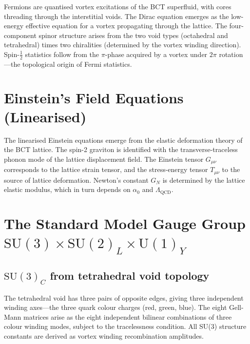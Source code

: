 \documentclass[review,number,sort&compress]{elsarticle}
\newcommand{\azero}{\alpha_0}
\newcommand{\LQCD}{\Lambda_{\mathrm{QCD}}}
\begin{document}
Fermions are quantised vortex excitations of the BCT superfluid, with
cores threading through the interstitial voids. The Dirac equation
emerges as the low-energy effective equation for a vortex propagating
through the lattice. The four-component spinor structure arises from the
two void types (octahedral and tetrahedral) times two chiralities
(determined by the vortex winding direction). Spin-$\frac{1}{2}$
statistics follow from the $\pi$-phase acquired by a vortex under
$2\pi$ rotation---the topological origin of Fermi statistics.

\section{Einstein's Field Equations (Linearised)}
\label{sec:einstein}

The linearised Einstein equations emerge from the elastic deformation
theory of the BCT lattice. The spin-2 graviton is identified with the
transverse-traceless phonon mode of the lattice displacement field.
The Einstein tensor $G_{\mu\nu}$ corresponds to the lattice strain
tensor, and the stress-energy tensor $T_{\mu\nu}$ to the source of
lattice deformation. Newton's constant $G_N$ is determined by the
lattice elastic modulus, which in turn depends on $\azero$ and $\LQCD$.

\section{The Standard Model Gauge Group
  $\mathrm{SU}(3) \times \mathrm{SU}(2)_L \times \mathrm{U}(1)_Y$}
\label{sec:gauge_group}

\subsection{$\mathrm{SU}(3)_C$ from tetrahedral void topology}

The tetrahedral void has three pairs of opposite edges, giving three
independent winding axes---the three quark colour charges (red, green,
blue). The eight Gell-Mann matrices arise as the eight independent
bilinear combinations of three colour winding modes, subject to the
tracelessness condition. All SU(3) structure constants are derived as
vortex winding recombination amplitudes.
\end{document}
